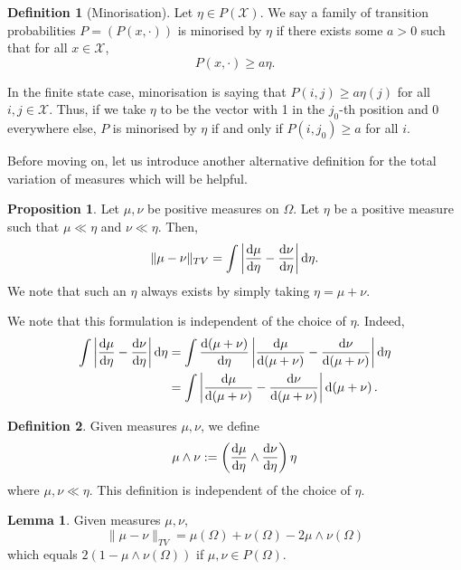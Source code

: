 \documentclass[]{article}
\theoremstyle{definition}
\theoremstyle{definition}
\newtheorem{definition}{Definition}[section]
\newtheorem{lemma}{Lemma}[section]
\newtheorem{proposition}{Proposition}[section]
\begin{document}
\begin{definition}[Minorisation]
  Let \(\eta \in P(\mathcal{X})\). We say a family of transition probabilities 
  \(P = (P(x, \cdot))\) is minorised by \(\eta\) if there exists some \(a > 0\) 
  such that for all \(x \in \mathcal{X}\),
  \[P(x, \cdot) \ge a \eta.\]
\end{definition}

In the finite state case, minorisation is saying that \(P(i, j) \ge a \eta(j)\) 
for all \(i, j \in \mathcal{X}\). Thus, if we take \(\eta\) to be the vector 
with 1 in the \(j_0\)-th position and 0 everywhere else, \(P\) is minorised by 
\(\eta\) if and only if \(P(i, j_0) \ge a\) for all \(i\).

Before moving on, let us introduce another alternative definition for the total 
variation of measures which will be helpful.

\begin{proposition}
  Let \(\mu, \nu\) be positive measures on \(\Omega\). Let \(\eta\) be 
  a positive measure such that \(\mu \ll \eta\) and \(\nu \ll \eta\). Then, 
  \[\|\mu - \nu\|_{TV} = \int \left|\dv{\mu}{\eta} - \dv{\nu}{\eta}\right| \dd \eta.\]
  We note that such an \(\eta\) always exists by simply taking \(\eta = \mu + \nu\).
\end{proposition}

We note that this formulation is independent of the choice of \(\eta\). 
Indeed,
\[\begin{split}
  \int \left|\dv{\mu}{\eta} - \dv{\nu}{\eta}\right| \dd \eta & = 
  \int \dv{(\mu + \nu)}{\eta} \left|\dv{\mu}{(\mu + \nu)} - \dv{\nu}{(\mu + \nu)}\right| \dd \eta\\
  & = \int \left|\dv{\mu}{(\mu + \nu)} - \dv{\nu}{(\mu + \nu)}\right| \dd (\mu + \nu).
\end{split}\]

\begin{definition}
  Given measures \(\mu, \nu\), we define 
  \[\mu \wedge \nu := \left(\dv{\mu}{\eta} \wedge \dv{\nu}{\eta}\right)\eta\]
  where \(\mu, \nu \ll \eta\). This definition is independent of the choice of \(\eta\).
\end{definition}

\begin{lemma}
  Given measures \(\mu, \nu\), 
  \[\|\mu - \nu\|_{TV} = \mu(\Omega) + \nu(\Omega) - 2 \mu \wedge \nu(\Omega)\]
  which equals \(2(1 - \mu \wedge \nu(\Omega))\) if \(\mu, \nu \in P(\Omega)\).
\end{lemma}
\end{document}
